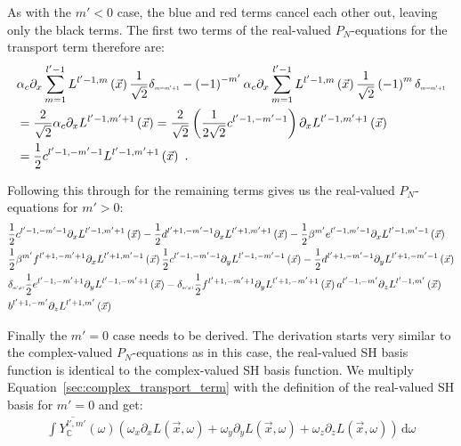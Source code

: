 \documentclass{egpubl}
\newcommand{\ud}{\,\mathrm{d}} %
\begin{document}
As with the $m'<0$ case, the blue and red terms cancel each other out, leaving only the black terms. The first two terms of the real-valued $P_N$-equations for the transport term therefore are:
\begin{align*}
&
\alpha_c\partial_x
\sum_{m=1}^{l'-1}L^{l'-1,m}\left (\vec{x}\right)
\frac{1}{\sqrt{2}}
\delta_{\scaleto{m=m'+1}{4pt}}
-
\left({-1}\right)^{-m'}
\alpha_c\partial_x
\sum_{m=1}^{l'-1}L^{l'-1,m}\left (\vec{x}\right)
\frac{1}{\sqrt{2}}
\left({-1}\right)^{m}
\delta_{\scaleto{m=m'+1}{4pt}}
\\&
=
\frac{2}{\sqrt{2}}
\alpha_c\partial_x
L^{l'-1,m'+1}\left (\vec{x}\right)
=
\frac{2}{\sqrt{2}}
\left(\frac{1}{2\sqrt{2}}c^{l'-1, -m'-1}\right)\partial_x
L^{l'-1,m'+1}\left (\vec{x}\right)
\\&
=
\frac{1}{2}c^{l'-1,-m'-1}L^{l'-1,m'+1}\left (\vec{x}\right) \ .
\end{align*}

Following this through for the remaining terms gives us the real-valued $P_N$-equations for $m'>0$:
\begin{align}
&
\frac{1}{2}c^{l'-1,-m'-1}\partial_x L^{l'-1,m'+1}\left (\vec{x}\right)
-\frac{1}{2}d^{l'+1,-m'-1}\partial_x L^{l'+1,m'+1}\left (\vec{x}\right)
-\frac{1}{2}\beta^{m'}e^{l'-1,m'-1}\partial_x L^{l'-1,m'-1}\left (\vec{x}\right)
\nonumber
\\&
\frac{1}{2}\beta^{m'}f^{l'+1,-m'+1}\partial_x L^{l'+1,m'-1}\left (\vec{x}\right)
\frac{1}{2}c^{l'-1,-m'-1}\partial_y L^{l'-1,-m'-1}\left (\vec{x}\right)
-\frac{1}{2}d^{l'+1,-m'-1}\partial_y L^{l'+1,-m'-1}\left (\vec{x}\right)
\nonumber
\\&
\delta_{\scaleto{m'\neq 1}{4pt}}\frac{1}{2}e^{l'-1,-m'+1}\partial_y L^{l'-1,-m'+1}\left (\vec{x}\right)
-\delta_{\scaleto{m'\neq 1}{4pt}}\frac{1}{2}f^{l'+1,-m'+1}\partial_y L^{l'+1,-m'+1}\left (\vec{x}\right)
a^{l'-1,-m'}\partial_z L^{l'-1,m'}\left (\vec{x}\right)
\nonumber
\\&
b^{l'+1,-m'}\partial_z L^{l'+1,m'}\left (\vec{x}\right)
\nonumber
\end{align}

Finally the $m'=0$ case needs to be derived. The derivation starts very similar to the complex-valued $P_N$-equations as in this case, the real-valued SH basis function is identical to the complex-valued SH basis function. We multiply Equation~\ref{sec:complex_transport_term} with the definition of the real-valued SH basis for $m'=0$ and get:
\begin{align*}
\int{\overline{Y_{\mathbb{C}}^{l', m'}}(\omega )\left(\omega_{x}\partial_xL\left (\vec{x} ,\omega \right )+\omega_{y}\partial_yL\left (\vec{x} ,\omega \right )+\omega_{z}\partial_zL\left (\vec{x} ,\omega \right )\right)\ud\omega}
\end{align*}
\end{document}

